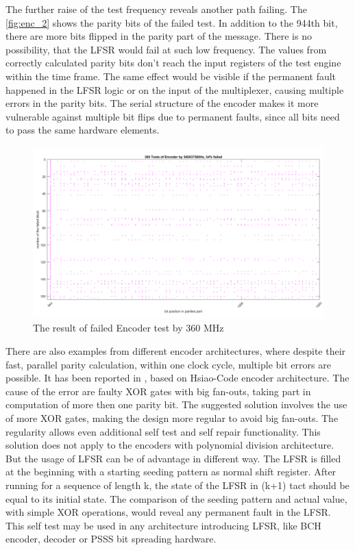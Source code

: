 The further raise of the test frequency reveals another path failing. The \autoref{fig:enc_2} shows the parity bits of the failed test. In addition to the 944th bit, there are more bits flipped in the parity part of the message. There is no possibility, that the LFSR would fail at such low frequency. The values from correctly calculated parity bits don't reach the input registers of the test engine within the time frame. The same effect would be visible if the permanent fault happened in the LFSR logic or on the input of the multiplexer, causing multiple errors in the parity bits. The serial structure of the encoder makes it more vulnerable against multiple bit flips due to permanent faults, since all bits need to pass the same hardware elements.

\begin{figure}[h]
\centering
\includegraphics[width=\textwidth]{figures/test_ENC_multiple.png}
\caption{The result of failed Encoder test by 360 MHz}
\label{fig:enc_2}
\end{figure}

There are also examples from different encoder architectures, where despite their fast, parallel parity calculation, within one clock cycle, multiple bit errors are possible. It has been reported in \cite{art:Dicorato}, based on Hsiao-Code encoder architecture. The cause of the error are faulty XOR gates with big fan-outs, taking part in computation of more then one parity bit. The suggested solution involves the use of more XOR gates, making the design more regular to avoid big fan-outs. The regularity allows even additional self test and self repair functionality. This solution does not apply to the encoders with polynomial division architecture. But the usage of LFSR can be of advantage in different way. The LFSR is filled at the beginning with a starting seeding pattern as normal shift register. After running for a sequence of length k, the state of the LFSR in (k+1) tact should be equal to its initial state. The comparison of the seeding pattern and actual value, with simple XOR operations, would reveal any permanent fault in the LFSR. This self test may be used in any architecture introducing LFSR, like BCH encoder, decoder or PSSS bit spreading hardware\cite{art:Pfeifer}.

